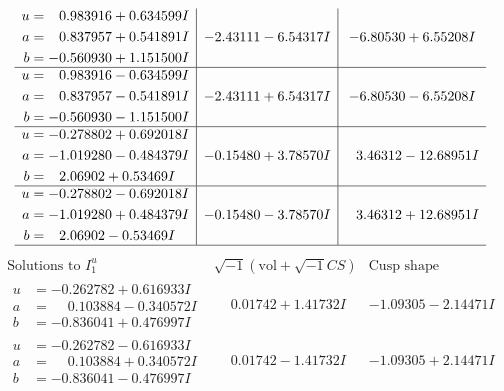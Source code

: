 \documentclass[1p]{elsarticle_modified}
\theoremstyle{definition}
\newcommand{\I}{\sqrt{-1}}
\begin{document}
$$\begin{array}{c|c|c}
\begin{aligned}
u &= \phantom{-}0.983916 + 0.634599 I \\
a &= \phantom{-}0.837957 + 0.541891 I \\
b &= -0.560930 + 1.151500 I\end{aligned}
 & -2.43111 - 6.54317 I & -6.80530 + 6.55208 I \\ \hline\begin{aligned}
u &= \phantom{-}0.983916 - 0.634599 I \\
a &= \phantom{-}0.837957 - 0.541891 I \\
b &= -0.560930 - 1.151500 I\end{aligned}
 & -2.43111 + 6.54317 I & -6.80530 - 6.55208 I \\ \hline\begin{aligned}
u &= -0.278802 + 0.692018 I \\
a &= -1.019280 - 0.484379 I \\
b &= \phantom{-}2.06902 + 0.53469 I\end{aligned}
 & -0.15480 + 3.78570 I & \phantom{-}3.46312 - 12.68951 I \\ \hline\begin{aligned}
u &= -0.278802 - 0.692018 I \\
a &= -1.019280 + 0.484379 I \\
b &= \phantom{-}2.06902 - 0.53469 I\end{aligned}
 & -0.15480 - 3.78570 I & \phantom{-}3.46312 + 12.68951 I\\
 \hline 
 \end{array}$$\newpage$$\begin{array}{c|c|c}  
\text{Solutions to }I^u_{1}& \I (\text{vol} + \sqrt{-1}CS) & \text{Cusp shape}\\
 \hline 
\begin{aligned}
u &= -0.262782 + 0.616933 I \\
a &= \phantom{-}0.103884 - 0.340572 I \\
b &= -0.836041 + 0.476997 I\end{aligned}
 & \phantom{-}0.01742 + 1.41732 I & -1.09305 - 2.14471 I \\ \hline\begin{aligned}
u &= -0.262782 - 0.616933 I \\
a &= \phantom{-}0.103884 + 0.340572 I \\
b &= -0.836041 - 0.476997 I\end{aligned}
 & \phantom{-}0.01742 - 1.41732 I & -1.09305 + 2.14471 I \\ \hline\begin{aligned}

\end{aligned}
\end{array}$$
\end{document}
